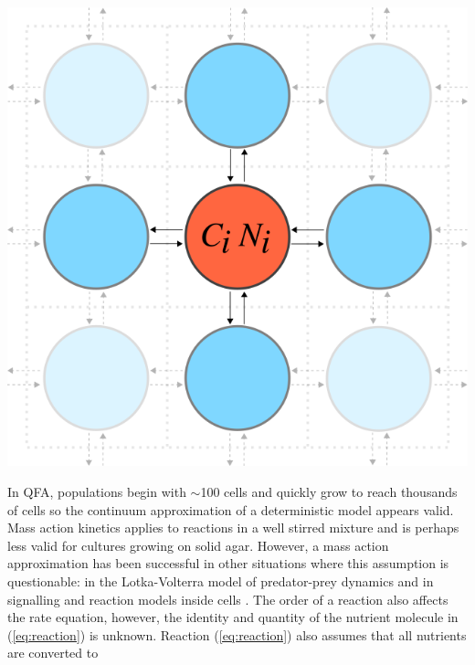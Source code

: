 \begin{Figure}
  \centering
  \includegraphics[width=\linewidth]{comp_model/comp_model_schematic2}
  \label{fig:comp_model_schematic}
\end{Figure}
%
In QFA, populations begin with \(\sim\)100 cells and quickly grow to
reach thousands of cells so the continuum approximation of a
deterministic model appears valid. Mass action kinetics applies to
reactions in a well stirred mixture and is perhaps less valid for
cultures growing on solid agar. However, a mass action approximation
has been successful in other situations where this assumption is
questionable: in the Lotka-Volterra model of predator-prey dynamics
\citep{Berryman1992} and in signalling and reaction models inside
cells \citep{Aldridge2006,Chen2010}. The order of a reaction also
affects the rate equation, however, the identity and quantity of the
nutrient molecule in (\ref{eq:reaction}) is unknown. Reaction
(\ref{eq:reaction}) also assumes that all nutrients are converted to
